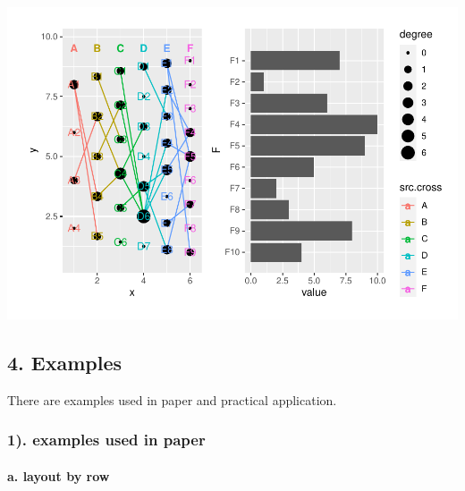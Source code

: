 \documentclass[
]{article}
\let\oldparagraph\paragraph
\renewcommand{\paragraph}[1]{\oldparagraph{#1}\mbox{}}
\begin{document}
\includegraphics{ReadMe1_files/figure-latex/unnamed-chunk-10-1.pdf}

\hypertarget{examples}{%
\subsection{4. Examples}\label{examples}}

There are examples used in paper and practical application.

\hypertarget{examples-used-in-paper}{%
\subsubsection{1). examples used in
paper}\label{examples-used-in-paper}}

\hypertarget{a.-layout-by-row}{%
\paragraph{a. layout by row}\label{a.-layout-by-row}}
\end{document}
